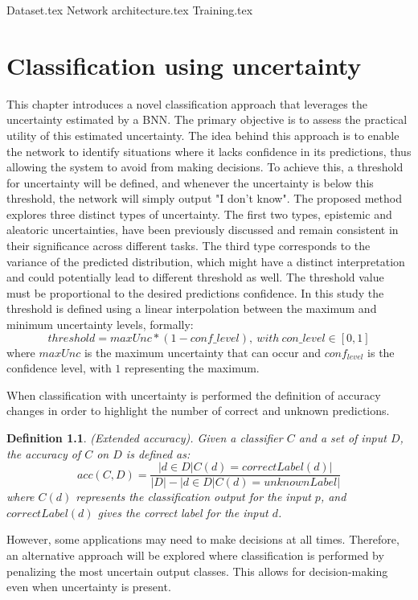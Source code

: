 \documentclass[
	12pt,
	a4paper,
	cleardoublepage=empty,
	headings=twolinechapter,
	numbers=autoenddot,
]{scrbook}
\newtheorem{definition}{Definition}[section]
\begin{document}
	{Dataset.tex}
	{Network architecture.tex}
	{Training.tex}
	
	\chapter{Classification using uncertainty}\label{chap:c3}
	
	This chapter introduces a novel classification approach that leverages the uncertainty estimated by a BNN. The primary objective is to assess the practical utility of this estimated uncertainty. The idea behind this approach is to enable the network to identify situations where it lacks confidence in its predictions, thus allowing the system to avoid from making decisions. To achieve this, a threshold for uncertainty will be defined, and whenever the uncertainty is below this threshold, the network will simply output "I don't know". 
	The proposed method explores three distinct types of uncertainty. The first two types, epistemic and aleatoric uncertainties, have been previously discussed and remain consistent in their significance across different tasks. The third type corresponds to the variance of the predicted distribution, which might have a distinct interpretation and could potentially lead to different threshold as well. The threshold value must be proportional to the desired predictions confidence. In this study the threshold is defined using a linear interpolation between the maximum and minimum uncertainty levels, formally:
	\[
		threshold = maxUnc * (1 - conf \_ level), \ with \ con \_ level \in [0,1]
	\]
	where $maxUnc$ is the maximum uncertainty that can occur and $conf_{level}$ is the confidence level, with $1$ representing the maximum.

	When classification with uncertainty is performed the definition of accuracy changes in order to highlight the number of correct and unknown predictions.
	
	\begin{definition} (Extended accuracy).
		Given a classifier $C$ and a set of input $D$, the accuracy of $C$ on $D$ is defined as:
		\[
			acc(C,D) = \frac{|{d \in D | C(d) = correctLabel(d)}|}{|D| - |{d \in D | C(d) = unknownLabel}|}
		\] 
		where $C(d)$ represents the classification output for the input $p$, and $correctLabel(d)$ gives the correct label for the input $d$.
	\end{definition}
	
	However, some applications may need to make decisions at all times. Therefore, an alternative approach will be explored where classification is performed by penalizing the most uncertain output classes. This allows for decision-making even when uncertainty is present.
	
\end{document}
